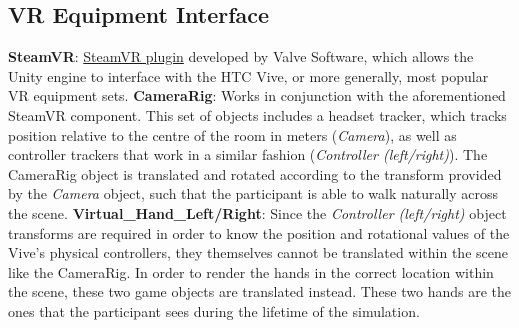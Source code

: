\documentclass{article}
\begin{document}
\subsection{VR Equipment Interface}
\textbf{SteamVR}: \href{https://bit.ly/2VnzLbI}{SteamVR plugin} developed by Valve Software, which allows the Unity engine to interface with the HTC Vive, or more generally, most popular VR equipment sets. \newline \newline
\textbf{CameraRig}: Works in conjunction with the aforementioned SteamVR component. This set of objects includes a headset tracker, which tracks position relative to the centre of the room in meters (\textit{Camera}), as well as controller trackers that work in a similar fashion (\textit{Controller (left\slash right)}). The CameraRig object is translated and rotated according to the transform provided by the \textit{Camera} object, such that the participant is able to walk naturally across the scene. \newline \newline
\textbf{Virtual\_Hand\_Left\slash Right}: Since the \textit{Controller (left\slash right)} object transforms are required in order to know the position and rotational values of the Vive's physical controllers, they themselves cannot be translated within the scene like the CameraRig. In order to render the hands in the correct location within the scene, these two game objects are translated instead. These two hands are the ones that the participant sees during the lifetime of the simulation. 
\end{document}
